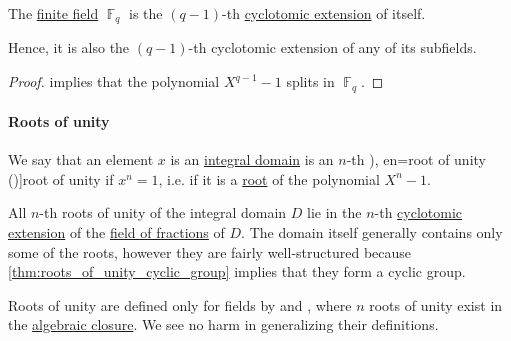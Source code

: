 \begin{proposition}\label{thm:finite_field_is_cyclotomic_extension}
  The \hyperref[def:finite_field]{finite field} \( \BbbF_q \) is the \( (q - 1) \)-th \hyperref[def:cyclotomic_extension]{cyclotomic extension} of itself.
\end{proposition}
\begin{comments}
  \item Hence, it is also the \( (q - 1) \)-th cyclotomic extension of any of its subfields.
\end{comments}
\begin{proof}
   implies that the polynomial \( X^{q - 1} - 1 \) splits in \( \BbbF_q \).
\end{proof}

\paragraph{Roots of unity}

\begin{definition}\label{def:root_of_unity}\mimprovised
  We say that an element \( x \) is an \hyperref[def:integral_domain]{integral domain} is an \( n \)-th \term[ru=корень из единицы (\cite[\S 14.4]{Тыртышников2007ЛинейнаяАлгебра}), en=root of unity (\cite[def. 2.41]{LidlNiederreiter1997FiniteFields})]{root of unity} if \( x^n = 1 \), i.e. if it is a \hyperref[def:polynomial_root]{root} of the polynomial \( X^n - 1 \).
\end{definition}
\begin{comments}
  \item All \( n \)-th roots of unity of the integral domain \( D \) lie in the \( n \)-th \hyperref[def:cyclotomic_extension]{cyclotomic extension} of the \hyperref[def:field_of_fractions]{field of fractions} of \( D \). The domain itself generally contains only some of the roots, however they are fairly well-structured because \cref{thm:roots_of_unity_cyclic_group} implies that they form a cyclic group.

  \item Roots of unity are defined only for fields by \textcite[def. 2.41]{LidlNiederreiter1997FiniteFields} and \textcite[276]{Lang2002Algebra}, where \( n \) roots of unity exist in the \hyperref[def:algebraic_closure]{algebraic closure}. We see no harm in generalizing their definitions.
\end{comments}

